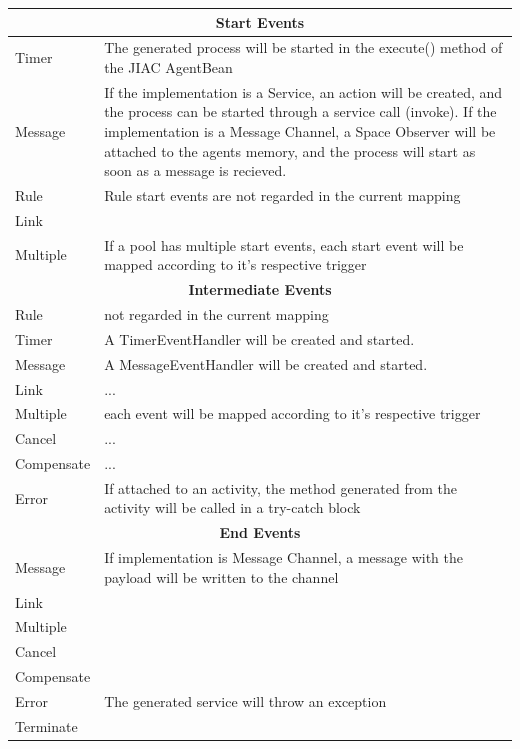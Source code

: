 		\begin{tabularx}{\linewidth}{|l|X|}\hline\hline
			\multicolumn{2}{|c|}{\textbf{Start Events}} \\\hline\hline
			 Timer & The generated process will be started in the execute() method of the JIAC AgentBean\\\hline
			 Message & If the implementation is a Service, an action will be created, and the process can be started through a service call (invoke). If the implementation is a Message Channel, a Space Observer will be attached to the agents memory, and the process will start as soon as a message is recieved.\\\hline
			 Rule & Rule start events are not regarded in the current mapping\\\hline
			 Link & \\\hline
			 Multiple & If a pool has multiple start events, each start event will be mapped according to it's respective trigger\\\hline\hline
			 
			 \multicolumn{2}{|c|}{\textbf{Intermediate Events}} \\\hline\hline
			 Rule & not regarded in the current mapping\\\hline
			 Timer & A TimerEventHandler will be created and started.\\\hline
			 Message & A MessageEventHandler will be created and started. \\\hline
			 Link & ...\\\hline
			 Multiple & each event will be mapped according to it's respective trigger\\\hline
			 Cancel & ... \\\hline
			 Compensate & ... \\\hline
			 Error & If attached to an activity, the method generated from the activity will be called in a try-catch block \\\hline\hline
			 
			 \multicolumn{2}{|c|}{\textbf{End Events}} \\\hline\hline
			 Message & If implementation is Message Channel, a message with the payload will be written to the channel \\\hline
			 Link & \\\hline
			 Multiple & \\\hline
			 Cancel & \\\hline
			 Compensate & \\\hline
			 Error & The generated service will throw an exception\\\hline
			 Terminate & \\\hline
		\end{tabularx}\\\\

